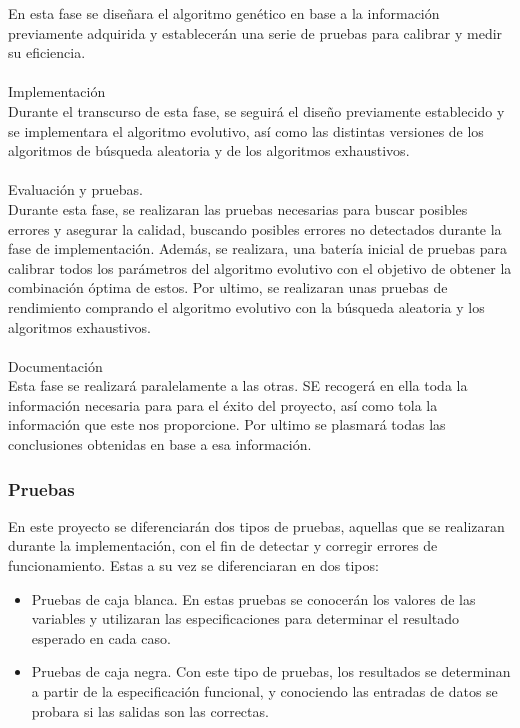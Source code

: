 \documentclass[a4paper,12pt,twoside,final]{book}
\begin{document}
En esta fase se diseñara el algoritmo genético en base a la información previamente adquirida y establecerán una serie de pruebas para calibrar y medir su eficiencia.\\
\\

Implementación\\

Durante el transcurso de esta fase, se seguirá el diseño previamente establecido y se implementara el algoritmo evolutivo, así como las distintas versiones de los algoritmos de búsqueda aleatoria y de los algoritmos exhaustivos.\\
\\
Evaluación y pruebas.\\

Durante esta fase, se realizaran las pruebas necesarias para buscar posibles errores y asegurar la calidad, buscando posibles errores no detectados durante la fase de implementación. Además, se realizara, una batería inicial de pruebas para calibrar todos los parámetros del algoritmo evolutivo con el objetivo de obtener la combinación óptima de estos. Por ultimo, se realizaran unas pruebas de rendimiento comprando el algoritmo evolutivo con la búsqueda aleatoria y los algoritmos exhaustivos.\\
\\
Documentación\\

Esta fase se realizará paralelamente a las otras. SE recogerá en ella toda la información necesaria para para el éxito del proyecto, así como tola la información que este nos proporcione. Por ultimo se plasmará todas las conclusiones obtenidas en base a esa información.\\


\subsubsection{Pruebas}
En este proyecto se diferenciarán dos tipos de pruebas, aquellas que se realizaran durante la implementación, con el fin de detectar y corregir errores de funcionamiento. Estas a su vez se diferenciaran en dos tipos:
\begin{itemize}
    \item Pruebas de caja blanca. En estas pruebas se conocerán los valores de las variables y utilizaran las especificaciones para determinar el resultado esperado en cada caso.
    \item Pruebas de caja negra. Con este tipo de pruebas, los resultados se determinan a partir de la especificación funcional, y conociendo las entradas de datos se probara si las salidas son las correctas.
\end{itemize}
\end{document}
